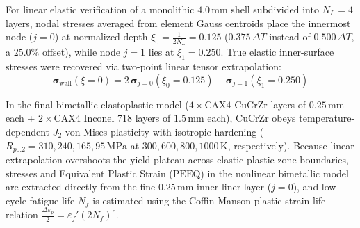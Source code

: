 \documentclass[11pt,a4paper]{article}
\begin{document}
For linear elastic verification of a monolithic $4.0\,\mathrm{mm}$ shell subdivided into $N_L = 4$ layers, nodal stresses averaged from element Gauss centroids place the innermost node ($j = 0$) at normalized depth $\xi_0 = \frac{1}{2 N_L} = 0.125$ ($0.375\,\Delta T$ instead of $0.500\,\Delta T$, a $25.0\%$ offset), while node $j = 1$ lies at $\xi_1 = 0.250$. True elastic inner-surface stresses were recovered via two-point linear tensor extrapolation:
\begin{equation}
\boldsymbol{\sigma}_{\mathrm{wall}}(\xi = 0) = 2\,\boldsymbol{\sigma}_{j=0}(\xi_0 = 0.125) - \boldsymbol{\sigma}_{j=1}(\xi_1 = 0.250)
\end{equation}

In the final bimetallic elastoplastic model ($4\times\mathrm{CAX4}$ $\mathrm{CuCrZr}$ layers of $0.25\,\mathrm{mm}$ each + $2\times\mathrm{CAX4}$ Inconel 718 layers of $1.5\,\mathrm{mm}$ each), $\mathrm{CuCrZr}$ obeys temperature-dependent $J_2$ von Mises plasticity with isotropic hardening ($R_{p0.2} = 310, 240, 165, 95\,\mathrm{MPa}$ at $300, 600, 800, 1000\,\mathrm{K}$, respectively). Because linear extrapolation overshoots the yield plateau across elastic-plastic zone boundaries, stresses and Equivalent Plastic Strain ($\mathrm{PEEQ}$) in the nonlinear bimetallic model are extracted directly from the fine $0.25\,\mathrm{mm}$ inner-liner layer ($j = 0$), and low-cycle fatigue life $N_f$ is estimated using the Coffin-Manson plastic strain-life relation $\frac{\Delta\varepsilon_p}{2} = \varepsilon_f' (2 N_f)^c$.
\end{document}

